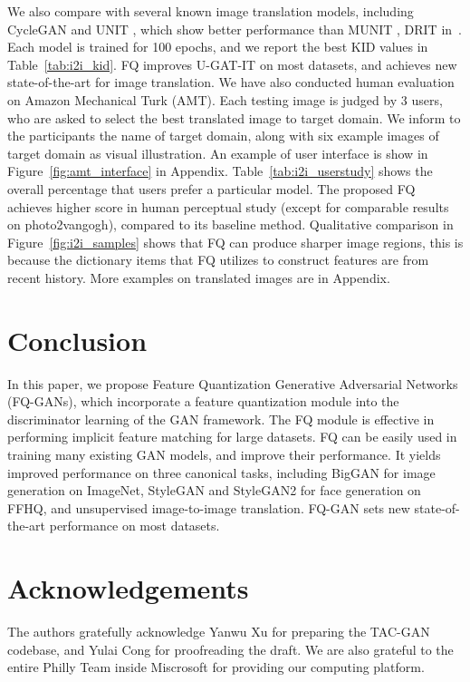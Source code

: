 \documentclass{article}
\begin{document}
We also compare with several known image translation models, including CycleGAN \citep{zhu2017unpaired} and UNIT \citep{huang2018multimodal}, which show better performance than MUNIT  \citep{liu2017unsupervised}, DRIT \citep{lee2018diverse} in~\citep{kim2019u}. Each model is trained for 100 epochs, and we report the best KID values in Table~\ref{tab:i2i_kid}. FQ improves U-GAT-IT on most datasets, and achieves new state-of-the-art for image translation. 
We have also conducted human evaluation on Amazon Mechanical Turk (AMT). Each testing image is judged by 3 users, who are asked to select the best translated image to target domain. We inform to the participants the name of target domain, along with six example images of target domain as visual illustration. An example of user interface is show in Figure~\ref{fig:amt_interface} in Appendix.
Table~\ref{tab:i2i_userstudy} shows the overall percentage that users prefer a particular model. The proposed FQ achieves higher score in human perceptual study (except for comparable results on photo2vangogh), compared to its baseline method. 
Qualitative comparison in Figure~\ref{fig:i2i_samples} shows that FQ can produce sharper image regions, this is because the dictionary items that FQ utilizes to construct features are from recent history. More examples on translated images are in Appendix.






\section{Conclusion}
In this paper, we propose Feature Quantization Generative Adversarial Networks (FQ-GANs), which incorporate a feature quantization module into the discriminator learning of the GAN framework. 
The FQ module is effective in performing implicit feature matching for large datasets. FQ can be easily used in training many existing GAN models, and improve their performance. It yields improved performance on three canonical tasks, including BigGAN for image generation on ImageNet,  StyleGAN and StyleGAN2 for face generation on FFHQ, and unsupervised image-to-image translation. FQ-GAN sets new state-of-the-art performance on most datasets.


\section*{Acknowledgements}
The authors gratefully acknowledge Yanwu Xu for preparing the TAC-GAN codebase, and Yulai Cong for proofreading the draft. We are also grateful to the entire Philly Team inside Miscrosoft for providing our computing platform.
\end{document}
